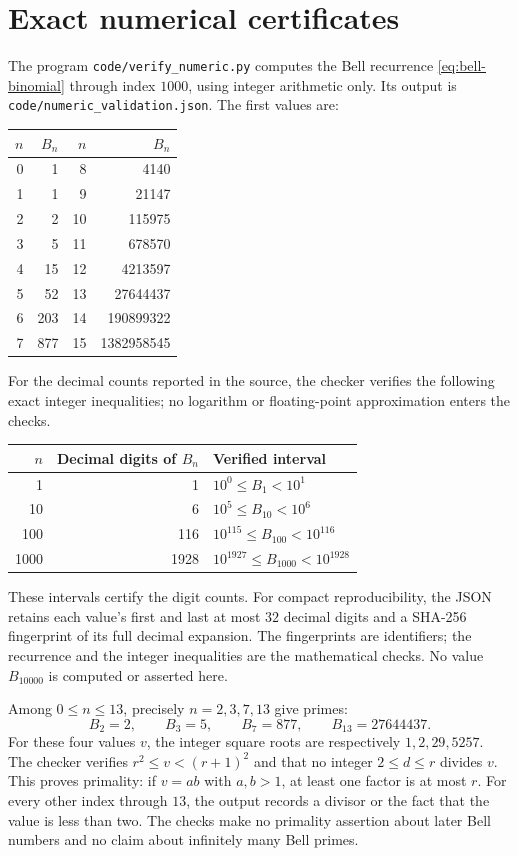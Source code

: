 \clearpage
\section{Exact numerical certificates}\label{sec:numeric}

The program \texttt{code/verify\_numeric.py} computes the Bell recurrence
\eqref{eq:bell-binomial} through index $1000$, using integer arithmetic only.
Its output is \texttt{code/numeric\_validation.json}. The first values are:
\begin{center}
\begin{tabular}{r r@{\qquad}r r}
\hline
$n$&$B_n$&$n$&$B_n$\\
\hline
0&1&8&4140\\
1&1&9&21147\\
2&2&10&115975\\
3&5&11&678570\\
4&15&12&4213597\\
5&52&13&27644437\\
6&203&14&190899322\\
7&877&15&1382958545\\
\hline
\end{tabular}
\end{center}

For the decimal counts reported in the source, the checker verifies the
following exact integer inequalities; no logarithm or floating-point
approximation enters the checks.
\begin{center}
\begin{tabular}{r r l}
\hline
$n$&Decimal digits of $B_n$&Verified interval\\
\hline
1&1&$10^0\leq B_1<10^1$\\
10&6&$10^5\leq B_{10}<10^6$\\
100&116&$10^{115}\leq B_{100}<10^{116}$\\
1000&1928&$10^{1927}\leq B_{1000}<10^{1928}$\\
\hline
\end{tabular}
\end{center}
These intervals certify the digit counts. For compact reproducibility, the
JSON retains each value's first and last at most $32$ decimal digits and a
SHA-256 fingerprint of its full decimal expansion. The fingerprints are
identifiers; the recurrence and the integer inequalities are the mathematical
checks. No value $B_{10000}$ is computed or asserted here.

Among $0\leq n\leq13$, precisely $n=2,3,7,13$ give primes:
\[
 B_2=2,\qquad B_3=5,\qquad B_7=877,\qquad B_{13}=27644437.
\]
For these four values $v$, the integer square roots are respectively
$1,2,29,5257$. The checker verifies $r^2\leq v<(r+1)^2$ and that no integer
$2\leq d\leq r$ divides $v$. This proves primality: if $v=ab$ with
$a,b>1$, at least one factor is at most $r$. For every other index through
$13$, the output records a divisor or the fact that the value is less than
two. The checks make no primality assertion about later Bell numbers and no
claim about infinitely many Bell primes.

